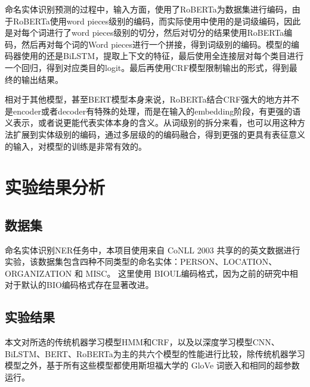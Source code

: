 \documentclass[a4paper, 12pt]{article}
\begin{document}
命名实体识别预测的过程中，输入方面，使用了RoBERTa为数据集进行编码，由于RoBERTa使用word pieces级别的编码，而实际使用中使用的是词级编码，因此是对每个词进行了word pieces级别的切分，然后对切分的结果使用RoBERTa编码，然后再对每个词的Word pieces进行一个拼接，得到词级别的编码。模型的编码器使用的还是BiLSTM，提取上下文的特征，最后使用全连接层对每个类目进行一个回归，得到对应类目的logit。最后再使用CRF模型限制输出的形式，得到最终的输出结果。

相对于其他模型，甚至BERT模型本身来说，RoBERTa结合CRF强大的地方并不是encoder或者decoder有特殊的处理，而是在输入的embedding阶段，有更强的语义表示，或者说更能代表实体本身的含义。从词级别的拆分来看，也可以用这种方法扩展到实体级别的编码，通过多层级的的编码融合，得到更强的更具有表征意义的输入，对模型的训练是非常有效的。



\section{实验结果分析} %
\label{sec:analysis}

\subsection{数据集} %
\label{sub:dataset}
命名实体识别NER任务中，本项目使用来自 CoNLL 2003 共享的的英文数据进行实验，该数据集包含四种不同类型的命名实体：PERSON、LOCATION、ORGANIZATION 和 MISC。 这里使用 BIOUL编码格式，因为之前的研究中相对于默认的BIO编码格式存在显著改进。

\subsection{实验结果} %
\label{sub:res}

本文对所选的传统机器学习模型HMM和CRF，以及以深度学习模型CNN、BiLSTM、BERT、RoBERTa为主的共六个模型的性能进行比较，除传统机器学习模型之外，基于所有这些模型都使用斯坦福大学的 GloVe 词嵌入和相同的超参数运行。
\end{document}
